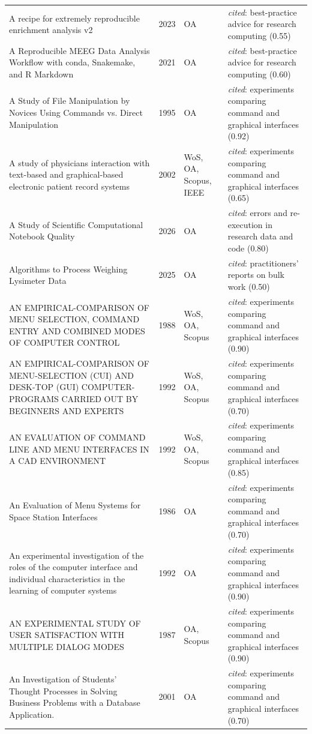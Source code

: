\begin{longtable}{@{}%
  >{\raggedright\arraybackslash}p{}c%
  >{\raggedright\arraybackslash}p{}%
  >{\raggedright\arraybackslash}p{}@{}}
A recipe for extremely reproducible enrichment analysis v2 & 2023 & OA & \emph{cited}: best-practice advice for research computing (0.55) \\
A Reproducible MEEG Data Analysis Workflow with conda, Snakemake, and R Markdown & 2021 & OA & \emph{cited}: best-practice advice for research computing (0.60) \\
A Study of File Manipulation by Novices Using Commands vs. Direct Manipulation & 1995 & OA & \emph{cited}: experiments comparing command and graphical interfaces (0.92) \\
A study of physicians interaction with text-based and graphical-based electronic patient record systems & 2002 & WoS, OA, Scopus, IEEE & \emph{cited}: experiments comparing command and graphical interfaces (0.65) \\
A Study of Scientific Computational Notebook Quality & 2026 & OA & \emph{cited}: errors and re-execution in research data and code (0.80) \\
Algorithms to Process Weighing Lysimeter Data & 2025 & OA & \emph{cited}: practitioners' reports on bulk work (0.50) \\
AN EMPIRICAL-COMPARISON OF MENU SELECTION, COMMAND ENTRY AND COMBINED MODES OF COMPUTER CONTROL & 1988 & WoS, OA, Scopus & \emph{cited}: experiments comparing command and graphical interfaces (0.90) \\
AN EMPIRICAL-COMPARISON OF MENU-SELECTION (CUI) AND DESK-TOP (GUI) COMPUTER-PROGRAMS CARRIED OUT BY BEGINNERS AND EXPERTS & 1992 & WoS, OA, Scopus & \emph{cited}: experiments comparing command and graphical interfaces (0.70) \\
AN EVALUATION OF COMMAND LINE AND MENU INTERFACES IN A CAD ENVIRONMENT & 1992 & WoS, OA, Scopus & \emph{cited}: experiments comparing command and graphical interfaces (0.85) \\
An Evaluation of Menu Systems for Space Station Interfaces & 1986 & OA & \emph{cited}: experiments comparing command and graphical interfaces (0.70) \\
An experimental investigation of the roles of the computer interface and individual characteristics in the learning of computer systems & 1992 & OA & \emph{cited}: experiments comparing command and graphical interfaces (0.90) \\
AN EXPERIMENTAL STUDY OF USER SATISFACTION WITH MULTIPLE DIALOG MODES & 1987 & OA, Scopus & \emph{cited}: experiments comparing command and graphical interfaces (0.90) \\
An Investigation of Students' Thought Processes in Solving Business Problems with a Database Application. & 2001 & OA & \emph{cited}: experiments comparing command and graphical interfaces (0.70) \\

\end{longtable}

